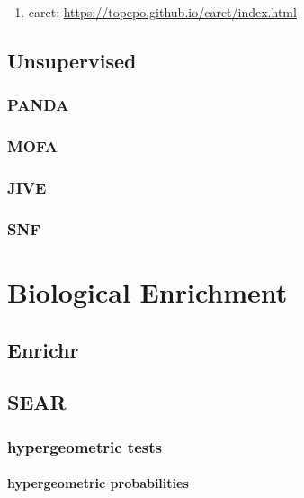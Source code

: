 \documentclass[]{book}
\providecommand{\tightlist}{%
  \setlength{\itemsep}{0pt}\setlength{\parskip}{0pt}}
\begin{document}
\begin{enumerate}
\def\labelenumi{\arabic{enumi}.}
\tightlist
\item
  caret: \url{https://topepo.github.io/caret/index.html}
\end{enumerate}

\section{Unsupervised}\label{unsupervised}

\subsection{PANDA}\label{panda-1}

\subsection{MOFA}\label{mofa}

\subsection{JIVE}\label{jive}

\subsection{SNF}\label{snf}

\chapter{Biological Enrichment}\label{bio-enrichment}

\section{Enrichr}\label{enrichr}

\section{SEAR}\label{sear}

\subsection{hypergeometric tests}\label{hypergeometric-tests}

\subsubsection{hypergeometric
probabilities}\label{hypergeometric-probabilities}
\end{document}
